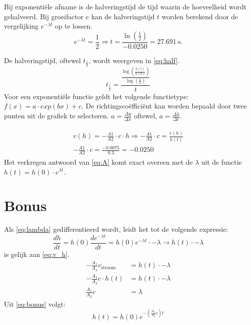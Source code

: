 \documentclass[numbers=endperiod]{scrartcl}
\begin{document}
Bij exponentiële afname is de halveringstijd de tijd waarin de hoeveelheid wordt gehalveerd. Bij groeifactor $e$ kan de halveringstijd $t$ worden berekend door de vergelijking $e^{-\lambda t}$ op te lossen.
\begin{equation}
e^{-\lambda t} = \frac{1}{2} \Rightarrow t =\frac{\ln(\frac{1}{2})}{-0.0250} = \SI{27.691}{\second}.
\end{equation}



De halveringstijd, oftewel $t_{\frac{1}{2}}$, wordt weergeven in \ref{eq:half}.
\begin{equation}\label{eq:half}
 t_{\frac{1}{2}}=\frac{\frac{\log\left(\frac{h(t)}{h(0)}\right)}{\log(\frac{1}{2})}}{t}
\end{equation}
Voor een exponentiële functie geldt het volgende functietype: $f(x) = a \cdot exp(bx)+c$. De richtingscoëfficiënt kan worden bepaald door twee punten uit de grafiek te selecteren. $a=\frac{\Delta y}{\Delta x}$ oftewel, $a=\frac{\Delta h}{\Delta t}$.  

\begin{align}\label{eq:A}
\begin{split}
v(h) = -\frac{A1}{A2} \cdot c \cdot h \Rightarrow -\frac{A1}{A2} \cdot c =\frac{v(h)}{h(t)}\\
-\frac{A1}{A2} \cdot c = \frac{-0.0075}{0.3} = -0.0250
\end{split}
\end{align}
Het verkregen antwoord van \ref{eq:A} komt exact overeen met de $\lambda$ uit de functie $h(t) = h(0)\cdot e^{\lambda t}$.

\newpage
\section{Bonus}
Als \cref{eq:lambda} gedifferentieerd wordt, leidt het tot de volgende expressie:
    \begin{equation}\label{eq:h_t_afgeleide_exp}
        \frac{dh}{dt} = h(0)\frac{de^{-\lambda t}}{dt} = h(0)e^{-\lambda t}\cdot-\lambda \rightarrow h(t)\cdot-\lambda
    \end{equation}
     is gelijk aan \cref{eq:v_h}.
    \begin{equation}\label{eq:bonus}
        \begin{split}
            -\frac{A_1}{A_2}v_{\text{stroom}} &= h(t)\cdot-\lambda\\
            -\frac{A_1}{A_2}c\cdot h(t) &= h(t)\cdot-\lambda\\
            \frac{A_1}{A_2}c &= \lambda
        \end{split}
    \end{equation}
    Uit \cref{eq:bonus} volgt:
    \begin{equation*}
        h(t) = h(0)e^{-\left(\frac{A_1}{A_2}c\right)t}
    \end{equation*}
\newpage
\end{document}
